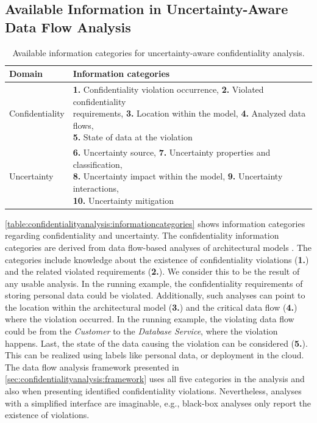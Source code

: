 \subsection{Available Information in Uncertainty-Aware Data Flow Analysis}

\begin{table}
    \begin{tabularx}{\linewidth}{lX}
        \toprule
        Domain \, & Information categories \\
        \midrule
        Confidentiality & \mtl{
        \textbf{1.} Confidentiality violation occurrence, 
        \textbf{2.} Violated confidentiality\\requirements, 
        \textbf{3.} Location within the model,
        \textbf{4.} Analyzed data flows,\\ 
        \textbf{5.} State of data at the violation}
        \\
        \midrule
        Uncertainty & \mtl{
        \textbf{6.} Uncertainty source,
        \textbf{7.} Uncertainty properties and classification,\\
        \textbf{8.} Uncertainty impact within the model,
        \textbf{9.} Uncertainty interactions,\\
        \textbf{10.} Uncertainty mitigation}\\
        \bottomrule
    \end{tabularx}
    \caption{Available information categories for uncertainty-aware confidentiality analysis.}%
    \label{table:confidentialityanalysis:informationcategories}
\end{table}

\autoref{table:confidentialityanalysis:informationcategories} shows information categories regarding confidentiality and uncertainty.
The confidentiality information categories are derived from data flow-based analyses of architectural models \cite{seifermann_unified_2021}.
The categories include knowledge about the existence of confidentiality violations (\textbf{1.}) and the related violated requirements (\textbf{2.}).
We consider this to be the result of any usable analysis.
In the running example, the confidentiality requirements of storing personal data could be violated.
Additionally, such analyses can point to the location within the architectural model (\textbf{3.}) and the critical data flow (\textbf{4.}) where the violation occurred.
In the running example, the violating data flow could be from the \emph{Customer} to the \emph{Database Service}, where the violation happens.
Last, the state of the data causing the violation can be considered (\textbf{5.}).
This can be realized using labels like personal data, or deployment in the cloud.
The data flow analysis framework presented in \autoref{sec:confidentialityanalysis:framework} uses all five categories in the analysis and also when presenting identified confidentiality violations.
Nevertheless, analyses with a simplified interface are imaginable, e.g., black-box analyses only report the existence of violations.

